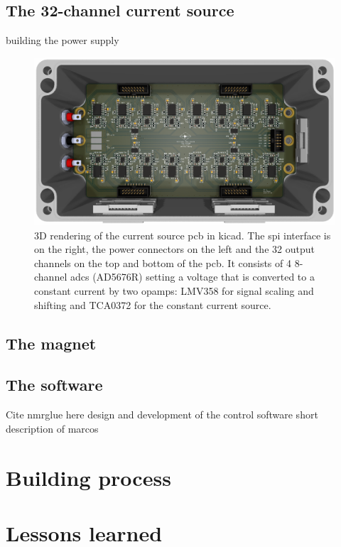 \section{The 32-channel current source}
building the power supply
\begin{figure}[hbt]
    \centering
    \includegraphics{images/32-channel_current_source.png}
    \caption{ 3D rendering of the current source \acrshort{pcb} in \gls{kicad}. The \acrshort{spi} interface is on the right, the power connectors on the left and the 32 output channels on the top and bottom of the \acrshort{pcb}. It consists of 4 8-channel \acrshort{adc}s (AD5676R) setting a voltage that is converted to a constant current by two \acrshort{opamp}s: LMV358 for signal scaling and shifting and TCA0372 for the constant current source.}
\end{figure}

\section{The magnet}

\section{The software}

Cite nmrglue here 
design and development of the control software
short description of marcos

\chapter{Building process}

\chapter{Lessons learned}
